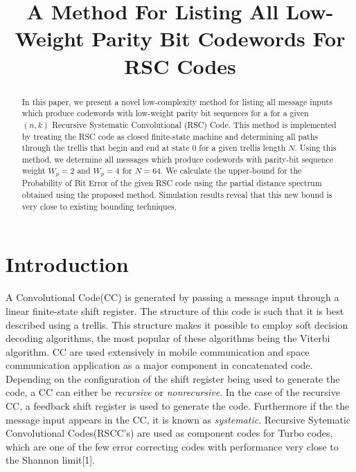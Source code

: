 \documentclass[conference]{IEEEtran}
\begin{document}
	
	\title{A Method For Listing All Low-Weight Parity Bit Codewords For RSC Codes\\
	}
	
	\author{
		\and
	}
	
	\maketitle
	
	\begin{abstract}
In this paper, we present a novel low-complexity method for listing all message inputs which produce codewords with low-weight parity bit sequences for a for a given $(n,k)$ Recursive Systematic Convolutional (RSC) Code.
This method is implemented by  treating  the RSC code as closed finite-state machine and determining all paths through the trellis that begin and end at state 0 for a given trellis length $N$. Using this method, we determine all messages which produce codewords with parity-bit sequence weight $W_p=2$ and $W_p=4$ for $N=64$. We calculate the upper-bound for the Probability of Bit Error  of the given RSC code using the partial distance spectrum obtained using the proposed method. Simulation results reveal that this new bound is very close to existing  bounding techniques.
\end{abstract}
	
\section{Introduction}

A Convolutional Code(CC) is generated by passing a message input through a linear finite-state shift register. The structure of this code is such that it is best described using a trellis. This structure makes it possible to employ soft decision decoding algorithms, the most popular of these algorithms being the Viterbi algorithm. CC are used extensively in mobile communication and space communication application as a major component in concatenated code.  Depending on the configuration of the shift register being used to generate the code, a CC can either be \textit{recursive} or \textit{nonrecursive}. In the case of the recursive CC, a feedback shift register is used to generate the code. Furthermore if the the message input appears in the CC, it is known as \textit{systematic}. Recursive Sytematic Convolutional Codes(RSCC's) are used as component codes for Turbo codes, which are one of the few error correcting codes with performance very close to the Shannon limit[1].
\end{document}
